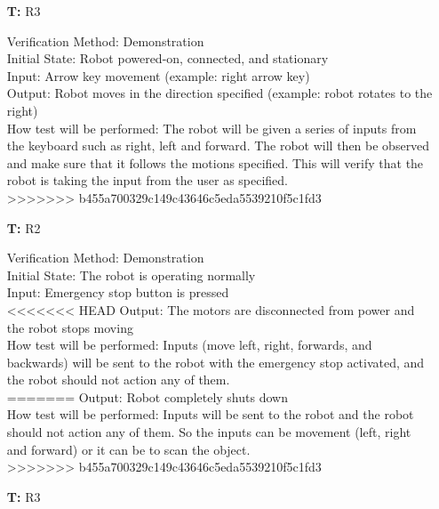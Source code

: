 \documentclass[12pt, titlepage]{article}
\newcounter{tnum} %
\begin{document}
\begin{itemize}
\item[\textbf{T\refstepcounter{tnum}\thetnum:}]{R3\\}
 
Verification Method: Demonstration\\
Initial State: Robot powered-on, connected, and stationary \\
Input: Arrow key movement (example: right arrow key) \\ 
Output: Robot moves in the direction specified (example: robot rotates to the right) \\ 
How test will be performed: The robot will be given a series of inputs from the keyboard such as right, left and forward. The robot will then be observed and make sure that it follows the motions specified. This will verify that the robot is taking the input from the user as specified. \\
>>>>>>> b455a700329c149c43646c5eda5539210f5c1fd3

\item[\textbf{T\refstepcounter{tnum}\thetnum:}]{R2\\}

Verification Method: Demonstration\\
Initial State: The robot is operating normally \\ 
Input: Emergency stop button is pressed \\ 
<<<<<<< HEAD
Output: The motors are disconnected from power and the robot stops moving \\
How test will be performed: Inputs (move left, right, forwards, and backwards) will be sent to the robot with the emergency stop activated, and the robot should not action any of them. \\
=======
Output: Robot completely shuts down \\
How test will be performed: Inputs will be sent to the robot and the robot should not action any of them. So the inputs can be movement (left, right and forward) or it can be to scan the object.  \\
>>>>>>> b455a700329c149c43646c5eda5539210f5c1fd3

\item[\textbf{T\refstepcounter{tnum}\thetnum:}]{R3\\}


\end{itemize}
\end{document}
